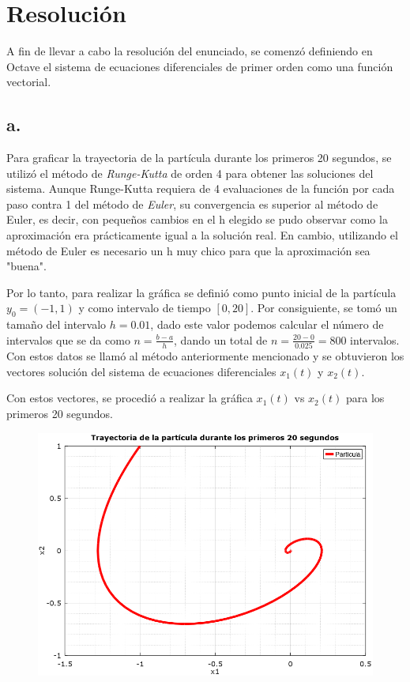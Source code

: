 \documentclass[11pt]{article}
\begin{document}
\newpage

\section*{Resolución}
A fin de llevar a cabo la resolución del enunciado, se comenzó definiendo en Octave el sistema de ecuaciones diferenciales de primer orden como una función vectorial.

\subsection*{a.}

Para graficar la trayectoria de la partícula durante los primeros 20 segundos, se utilizó el método de \textit{Runge-Kutta} de orden 4 para obtener las soluciones del sistema. Aunque Runge-Kutta requiera de 4 evaluaciones de la función por cada paso contra 1 del método de \textit{Euler}, su convergencia es superior al método de Euler, es decir, con pequeños cambios en el h elegido se pudo observar como la aproximación era prácticamente igual a la solución real. En cambio, utilizando el método de Euler es necesario un h muy chico para que la aproximación sea "buena".

Por lo tanto, para realizar la gráfica se definió como punto inicial de la partícula $y_0=(-1,1)$ y como intervalo de tiempo $[0,20]$. Por consiguiente, se tomó un tamaño del intervalo $h=0.01$, dado este valor podemos calcular el número de intervalos que se da como $n=\frac{b-a}{h}$, dando un total de $n=\frac{20-0}{0.025}=800$ intervalos. Con estos datos se llamó al método anteriormente mencionado y se obtuvieron los vectores solución del sistema de ecuaciones diferenciales $x_1(t)$ y $x_2(t)$.

Con estos vectores, se procedió a realizar la gráfica $x_1(t)$ vs $x_2(t)$ para los primeros 20 segundos.
\\
\begin{figure}[h]
	\centering
	\includegraphics{trayectoria20s3.png}
\end{figure}
\end{document}
